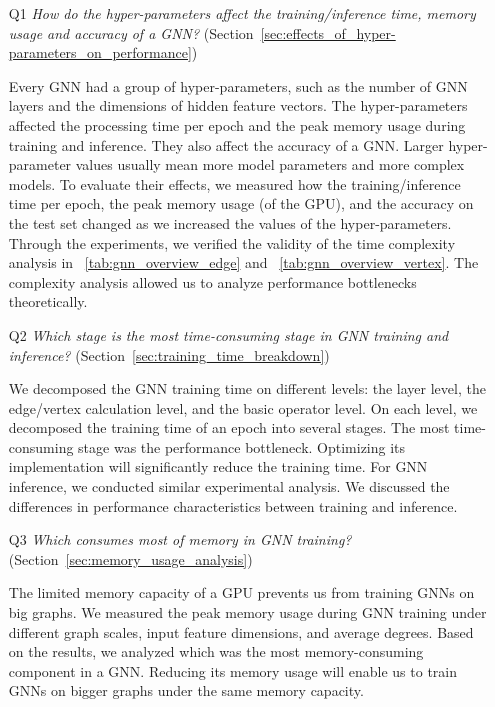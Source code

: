 \begin{itemize}

    \item[Q1] \emph{How do the hyper-parameters affect the training/inference time, memory usage and accuracy of a GNN?} (Section~\ref{sec:effects_of_hyper-parameters_on_performance})

          Every GNN had a group of hyper-parameters, such as the number of GNN layers and the dimensions of hidden feature vectors.
          The hyper-parameters affected the processing time per epoch and the peak memory usage during training and inference.
          They also affect the accuracy of a GNN.
          Larger hyper-parameter values usually mean more model parameters and more complex models.
          To evaluate their effects, we measured how the training/inference time per epoch, the peak memory usage (of the GPU), and the accuracy on the test set changed as we increased the values of the hyper-parameters.
          Through the experiments, we verified the validity of the time complexity analysis in \tablename~\ref{tab:gnn_overview_edge} and \tablename~\ref{tab:gnn_overview_vertex}.
          The complexity analysis allowed us to analyze performance bottlenecks theoretically.

    \item[Q2] \emph{Which stage is the most time-consuming stage in GNN training and inference?} (Section~\ref{sec:training_time_breakdown})

          We decomposed the GNN training time on different levels: the layer level, the edge/vertex calculation level, and the basic operator level.
          On each level, we decomposed the training time of an epoch into several stages.
          The most time-consuming stage was the performance bottleneck.
          Optimizing its implementation will significantly reduce the training time.
          For GNN inference, we conducted similar experimental analysis.
          We discussed the differences in performance characteristics between training and inference.

    \item[Q3] \emph{Which consumes most of memory in GNN training?} (Section~\ref{sec:memory_usage_analysis})

          The limited memory capacity of a GPU prevents us from training GNNs on big graphs.
          We measured the peak memory usage during GNN training under different graph scales, input feature dimensions, and average degrees.
          Based on the results, we analyzed which was the most memory-consuming component in a GNN.
          Reducing its memory usage will enable us to train GNNs on bigger graphs under the same memory capacity.


\end{itemize}
